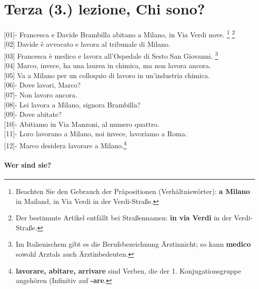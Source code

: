 \documentclass{article}
\begin{document}
\section{Terza (3.) lezione, Chi sono?}

[01]- Francesca e Davide Brambilla abitano a Milano, in Via Verdi nove.
\footnote{
Beachten Sie den Gebrauch der Präpositionen (Verhältniswörter): \textbf{
a Milano} \glqq in Mailand\grqq, in Via Verdi \glqq in der Verdi-Straße\grqq.}
\footnote{Der bestimmte Artikel entfällt bei Straßennamen: \textbf{in via
Verdi} \glqq in der Verdi-Straße\grqq.}
\\
{[02]} Davide è avvocato e lavora al tribunale di Milano.
\\
{[03]} Francesca è medico e lavora all'Ospedale di Sesto San Giovanni.
\footnote{Im Italienischem gibt es die
Berufsbezeichnung \glqq Ärztin\grqq nicht; so kann \textbf{
medico} sowohl \glqq Arzt\grqq als auch \glqq Ärztin\grqq bedeuten.}
\\
{[04]} Marco, invece, ha una laurea in chimica, ma non lavora ancora.
\\
{[05]} Va a Milano per un colloquio di lavoro in un'industria chimica.
\\
{[06]}- Dove lavori, Marco?\\
{[07]}- Non lavoro ancora.\\
{[08]}- Lei lavora a Milano, signora Brambilla?\\
{[09]}- Dove abitate?\\
{[10]}- Abitiamo in Via Manzoni, al numero quattro.\\
{[11]}- Loro lavorano a Milano, noi invece, lavoriamo a Roma.\\
{[12]}-  Marco desidera lavorare a Milano.\footnote{\textbf{lavorare, abitare,
    arrivare} sind Verben, die der 1. Konjugationsgruppe angehören (Infinitiv
auf \textbf{-are}.}

\paragraph{Wer sind sie?}
\end{document}
